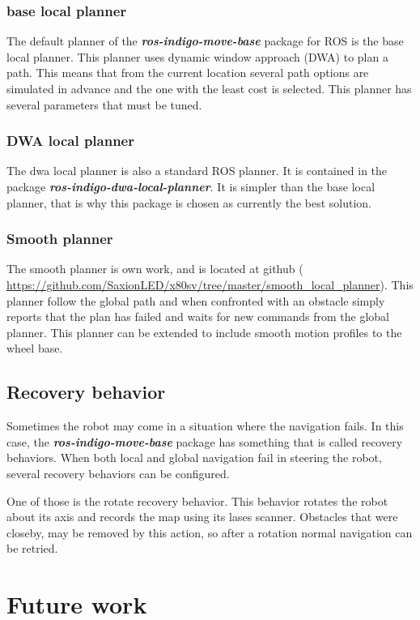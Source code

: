 \documentclass[a4paper]{article}
\newcommand{\rospackage}[1]{\textbf{\textit{ros-indigo-#1}}}
\begin{document}
\subsubsection{base local planner}
The default planner of the \rospackage{move-base} package for ROS is the base local planner.
This planner uses dynamic window approach (DWA) to plan a path. This means that from the current 
location several path options are simulated in advance and the one with the least cost is selected.
This planner has several parameters that must be tuned.

\subsubsection{DWA local planner}
The dwa local planner is also a standard ROS planner. It is contained in the package
\rospackage{dwa-local-planner}.
It is simpler than the base local planner,
that is why this package is chosen as currently the best solution.

\subsubsection{Smooth planner}
The smooth planner is own work, and is located at github (
\url{https://github.com/SaxionLED/x80sv/tree/master/smooth_local_planner}).
This planner follow the global path and when confronted with an obstacle simply
reports that the plan has failed and waits for new commands from the global planner.
This planner can be extended to include smooth motion profiles to the wheel base.

\subsection{Recovery behavior}
Sometimes the robot may come in a situation where the navigation fails. In this case, the 
\rospackage{move-base} package
has something that is called recovery behaviors. When both local and global navigation fail in
steering the robot, several recovery behaviors can be configured.

One of those is the rotate
recovery behavior. This behavior rotates the robot about its axis and records the map using its lases
scanner. Obstacles that were closeby, may be removed by this action, so after a rotation normal navigation
can be retried.

\section{Future work}
\end{document}
